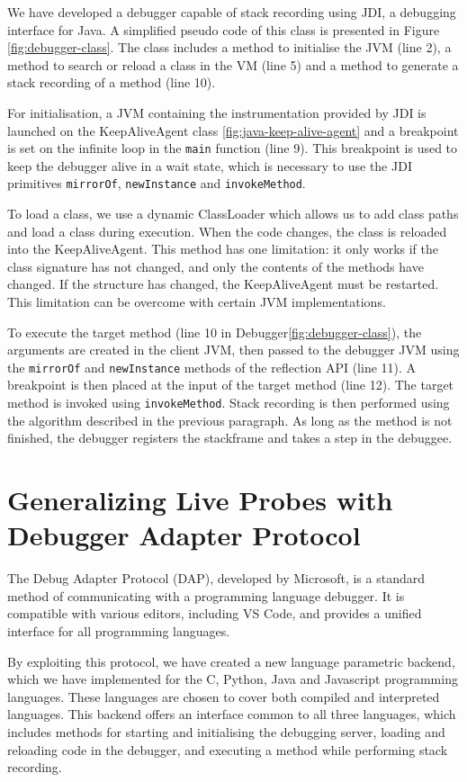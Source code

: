 \documentclass[english,submission]{programming}
\newcommand{\code}[1]{\colorbox{codegray}{\texttt{#1}}}
\begin{document}
We have developed a debugger capable of stack recording using JDI, a debugging interface for Java. 
A simplified pseudo code of this class is presented in Figure \ref{fig:debugger-class}.
The class includes a method to initialise the JVM (line 2), a method to search or reload a class in the VM (line 5) and a method to generate a stack recording of a method (line 10). 

For initialisation, a JVM containing the instrumentation provided by JDI is launched on the KeepAliveAgent class \ref{fig:java-keep-alive-agent} and a breakpoint is set on the infinite loop in the \code{main} function (line 9). 
This breakpoint is used to keep the debugger alive in a wait state, which is necessary to use the JDI primitives \code{mirrorOf}, \code{newInstance} and \code{invokeMethod}.

To load a class, we use a dynamic ClassLoader which allows us to add class paths and load a class during execution. 
When the code changes, the class is reloaded into the KeepAliveAgent. 
This method has one limitation: it only works if the class signature has not changed, and only the contents of the methods have changed. 
If the structure has changed, the KeepAliveAgent must be restarted. 
This limitation can be overcome with certain JVM implementations\cite{KABANOV201151}.

To execute the target method (line 10 in Debugger\ref{fig:debugger-class}), the arguments are created in the client JVM, then passed to the debugger JVM using the \code{mirrorOf} and \code{newInstance} methods of the reflection API (line 11). 
A breakpoint is then placed at the input of the target method (line 12).
The target method is invoked using \code{invokeMethod}. 
Stack recording is then performed using the algorithm described in the previous paragraph. 
As long as the method is not finished, the debugger registers the stackframe and takes a step in the debuggee.

\section{Generalizing Live Probes with Debugger Adapter Protocol}
\label{sec:generalizing-live-probes}
The Debug Adapter Protocol (DAP), developed by Microsoft, is a standard method of communicating with a programming language debugger. It is compatible with various editors, including VS Code, and provides a unified interface for all programming languages. 

By exploiting this protocol, we have created a new language parametric backend, which we have implemented for the C, Python, Java and Javascript programming languages. These languages are chosen to cover both compiled and interpreted languages. 
This backend offers an interface common to all three languages, which includes methods for starting and initialising the debugging server, loading and reloading code in the debugger, and executing a method while performing stack recording. 
\end{document}
